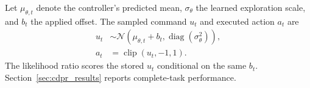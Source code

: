 Let $\mu_{\theta,t}$ denote the controller's predicted mean, $\sigma_\theta$ the learned exploration scale, and $b_t$ the applied offset. The sampled command $u_t$ and executed action $a_t$ are
\begin{equation}
\begin{aligned}
u_t&\sim\mathcal N(\mu_{\theta,t}+b_t,\operatorname{diag}(\sigma_\theta^2)),\\
a_t&=\operatorname{clip}(u_t,-1,1).
\end{aligned}
\label{eq:latent_action}
\end{equation}
The likelihood ratio scores the stored $u_t$ conditional on the same $b_t$. Section~\ref{sec:cdpr_results} reports complete-task performance.
